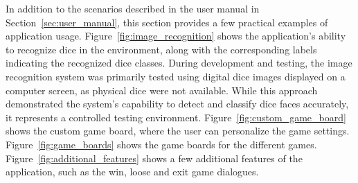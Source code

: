 In addition to the scenarios described in the user manual in Section~\ref{sec:user_manual}, this section provides a few practical examples of application usage. Figure~\ref{fig:image_recognition} shows the application’s ability to recognize dice in the environment, along with the corresponding labels indicating the recognized dice classes. During development and testing, the image recognition system was primarily tested using digital dice images displayed on a computer screen, as physical dice were not available. While this approach demonstrated the system's capability to detect and classify dice faces accurately, it represents a controlled testing environment. Figure~\ref{fig:custom_game_board} shows the custom game board, where the user can personalize the game settings. Figure~\ref{fig:game_boards} shows the game boards for the different games. Figure~\ref{fig:additional_features} shows a few additional features of the application, such as the win, loose and exit game dialogues.

